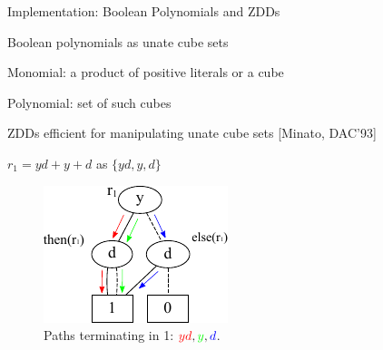 


\begin{frame}{\large{Implementation: Boolean Polynomials and ZDDs}}
\bi
  \item Boolean polynomials as unate cube sets
  \bi
      \item Monomial: a product of positive literals or a cube
      \item Polynomial: set of such cubes
  \ei
  \pause
  \item ZDDs efficient for manipulating unate cube sets [Minato, DAC'93]
  \pause
  \item $r_1 = yd + y + d$ as $\{yd,y,d\}$
\ei
\begin{figure}[hbt]
\centering
\includegraphics[scale=1.5]{r1_clean_paths.pdf}
\caption*{Paths terminating in 1: ${\color{red} yd}, {\color{green} y}, {\color{blue} d}  $.}
\label{r1}
\end{figure}
  
\end{frame}

